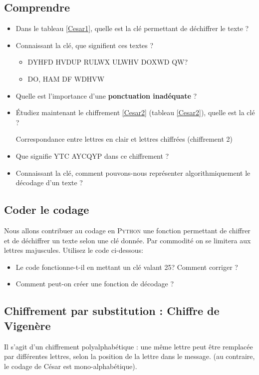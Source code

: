 \subsection{Comprendre}
\begin{itemize}
  \item Dans le tableau \ref{Cesar1}, quelle est la clé permettant de déchiffrer le texte ?
  \item Connaissant la clé, que signifient ces textes ?
\begin{itemize}
  \item DYHFD HVDUP RULWX ULWHV DOXWD QW?
  \item DO, HAM DF WDHVW
\end{itemize}
  \item Quelle est l'importance d'une \textbf{ponctuation inadéquate} ?
  \item Étudiez maintenant le chiffrement \ref{Cesar2} (tableau \ref{Cesar2}), quelle est la clé ?
\begin{table}[h]
\begin{tiny}

\end{tiny}
\caption{\label{Cesar2}Correspondance entre lettres en clair et lettres chiffrées (chiffrement 2)} %
\end{table}
  \item Que signifie YTC AYCQYP dans ce chiffrement ?
  \item Connaissant la clé, comment pouvons-nous représenter algorithmiquement le décodage d'un texte ?
\end{itemize}

\subsection{Coder le codage}
 Nous allons contribuer au codage en \textsc{Python} une fonction permettant de chiffrer et de déchiffrer un texte selon une clé donnée.
Par commodité on se limitera aux lettres majuscules.
Utilisez le code ci-dessous:


\begin{itemize}
  \item Le code fonctionne-t-il en mettant un clé valant 25? Comment corriger ?
  \item Comment peut-on créer une fonction de décodage ?
\end{itemize}

\subsection{Chiffrement par substitution : Chiffre de Vigenère}
 Il s'agit d'un chiffrement polyalphabétique : une même lettre peut être remplacée par différentes lettres, selon la position de la lettre dans le message. (au contraire, le codage de César est mono-alphabétique).%

